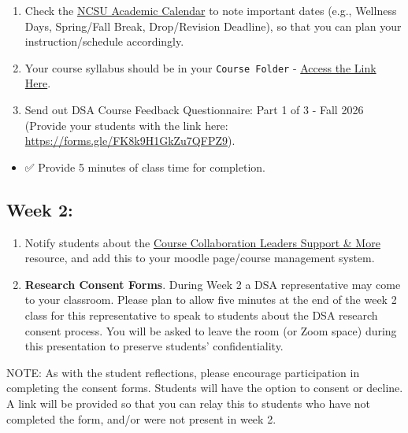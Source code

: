 \documentclass[
  letterpaper,
  DIV=11,
  numbers=noendperiod]{scrreprt}
\providecommand{\tightlist}{%
  \setlength{\itemsep}{0pt}\setlength{\parskip}{0pt}}
\begin{document}
\begin{enumerate}
\def\labelenumi{\arabic{enumi})}
\item
  Check the
  \href{https://studentservices.ncsu.edu/calendars/academic/}{NCSU
  Academic Calendar} to note important dates (e.g., Wellness Days,
  Spring/Fall Break, Drop/Revision Deadline), so that you can plan your
  instruction/schedule accordingly.
\item
  Your course syllabus should be in your \texttt{Course\ Folder} -
  \href{https://docs.google.com/spreadsheets/d/1BfmKDDVHphxg9P5aBqG5MKlu0ZaOudI4i4zswpZXQI0/edit?usp=sharing}{Access
  the Link Here}.
\item
  Send out {DSA Course Feedback Questionnaire: Part 1 of 3 - Fall 2026}
  (Provide your students with the link here:
  \url{https://forms.gle/FK8k9H1GkZu7QFPZ9}).
\end{enumerate}

\begin{itemize}
\tightlist
\item
  ✅ Provide 5 minutes of class time for completion.
\end{itemize}

\subsection{Week 2:}\label{week-2}

\begin{enumerate}
\def\labelenumi{\arabic{enumi})}
\item
  Notify students about the
  \href{https://datascienceacademy.ncsu.edu/courses/course-collaboration-leaders/}{Course
  Collaboration Leaders Support \& More} resource, and add this to your
  moodle page/course management system.
\item
  \textbf{Research Consent Forms}. During Week 2 a DSA representative
  may come to your classroom. Please plan to allow five minutes at the
  end of the week 2 class for this representative to speak to students
  about the DSA research consent process. You will be asked to leave the
  room (or Zoom space) during this presentation to preserve students'
  confidentiality.
\end{enumerate}

NOTE: As with the student reflections, please encourage participation in
completing the consent forms. Students will have the option to consent
or decline. A link will be provided so that you can relay this to
students who have not completed the form, and/or were not present in
week 2.
\end{document}
